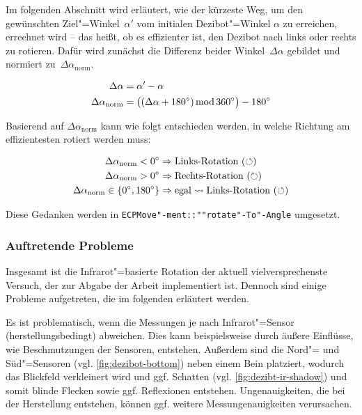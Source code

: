 Im folgenden Abschnitt wird erläutert, wie der kürzeste Weg, um den gewünschten Ziel"=Winkel~$\alpha'$ vom initialen Dezibot"=Winkel $\alpha$ zu erreichen, errechnet wird -- das heißt, ob es effizienter ist, den Dezibot nach links oder rechts zu rotieren. Dafür wird zunächst die Differenz beider Winkel~$\Delta\alpha$ gebildet und normiert zu~$\Delta\alpha_{\text{norm}}$.

\vspace{-1em}
\begin{equation*}
\begin{aligned}
    \Delta\alpha &= \alpha' - \alpha \\
    \Delta\alpha_{\text{norm}} &= \big( (\Delta\alpha + 180^\circ) \operatorname{mod} 360^\circ \big) - 180^\circ
\end{aligned}
\end{equation*}

Basierend auf $\Delta\alpha_{\text{norm}}$ kann wie folgt entschieden werden, in welche Richtung am effizientesten rotiert werden muss:

\vspace{-1em}
\begin{equation*}
\begin{aligned}
    \Delta\alpha_{\text{norm}} < 0^\circ &\Rightarrow \text{Links-Rotation} ~(\circlearrowleft)\\
    \Delta\alpha_{\text{norm}} > 0^\circ &\Rightarrow \text{Rechts-Rotation} ~(\circlearrowright)\\
    \Delta\alpha_{\text{norm}} \in \lbrace 0^\circ, 180^\circ \rbrace &\Rightarrow \text{egal} \leadsto \text{Links-Rotation} ~(\circlearrowleft)
\end{aligned}
\end{equation*}

Diese Gedanken werden in \texttt{ECPMove"-ment::""rotate"-To"-Angle} umgesetzt.


\subsubsection{Auftretende Probleme}

Insgesamt ist die Infrarot"=basierte Rotation der aktuell vielversprechenste Versuch, der zur Abgabe der Arbeit implementiert ist.
Dennoch sind einige Probleme aufgetreten, die im folgenden erläutert werden.


Es ist problematisch, wenn die Messungen je nach Infrarot"=Sensor (herstellungsbedingt) abweichen. Dies kann beispielsweise durch äußere Einflüsse, wie Beschmutzungen der Sensoren, entstehen. Außerdem sind die Nord"= und Süd"=Sensoren (vgl. \autoref{fig:dezibot-bottom}) neben einem Bein platziert, wodurch das Blickfeld verkleinert wird und ggf. Schatten (vgl. \autoref{fig:dezibt-ir-shadow}) und somit blinde Flecken sowie ggf. Reflexionen entstehen. Ungenauigkeiten, die bei der Herstellung entstehen, können ggf. weitere Messungenauigkeiten verursachen.


